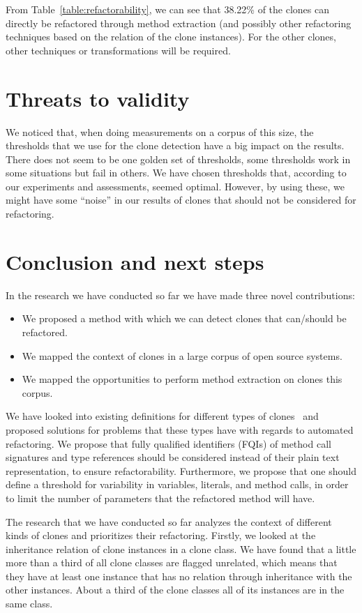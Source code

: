 \documentclass[a4paper]{article}
\begin{document}
From Table~\ref{table:refactorability}, we can see that 38.22\% of the clones can directly be refactored through method extraction (and possibly other refactoring techniques based on the relation of the clone instances). For the other clones, other techniques or transformations will be required.

\section{Threats to validity}\label{chap:threatstovalidity}
We noticed that, when doing measurements on a corpus of this size, the thresholds that we use for the clone detection have a big impact on the results. There does not seem to be one golden set of thresholds, some thresholds work in some situations but fail in others. We have chosen thresholds that, according to our experiments and assessments, seemed optimal. However, by using these, we might have some ``noise'' in our results of clones that should not be considered for refactoring.

\section{Conclusion and next steps}\label{chap:conclusion}
In the research we have conducted so far we have made three novel contributions:
\begin{itemize}
    \item We proposed a method with which we can detect clones that can/should be refactored.
    \item We mapped the context of clones in a large corpus of open source systems.
    \item We mapped the opportunities to perform method extraction on clones this corpus.
\end{itemize}

We have looked into existing definitions for different types of clones~\cite{roy2007survey} and proposed solutions for problems that these types have with regards to automated refactoring. We propose that fully qualified identifiers (FQIs) of method call signatures and type references should be considered instead of their plain text representation, to ensure refactorability. Furthermore, we propose that one should define a threshold for variability in variables, literals, and method calls, in order to limit the number of parameters that the refactored method will have.

The research that we have conducted so far analyzes the context of different kinds of clones and prioritizes their refactoring. Firstly, we looked at the inheritance relation of clone instances in a clone class. We have found that a little more than a third of all clone classes are flagged unrelated, which means that they have at least one instance that has no relation through inheritance with the other instances. About a third of the clone classes all of its instances are in the same class.
\end{document}
